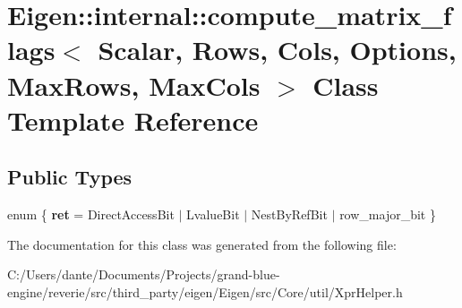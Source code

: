 \hypertarget{class_eigen_1_1internal_1_1compute__matrix__flags}{}\section{Eigen\+::internal\+::compute\+\_\+matrix\+\_\+flags$<$ Scalar, Rows, Cols, Options, Max\+Rows, Max\+Cols $>$ Class Template Reference}
\label{class_eigen_1_1internal_1_1compute__matrix__flags}
\subsection*{Public Types}
\begin{DoxyCompactItemize}
\item 
\mbox{\label{class_eigen_1_1internal_1_1compute__matrix__flags_aa499f28003d84edb537e3632a9256bbe}} 
enum \{ {\bfseries ret} = Direct\+Access\+Bit $\vert$ Lvalue\+Bit $\vert$ Nest\+By\+Ref\+Bit $\vert$ row\+\_\+major\+\_\+bit
 \}
\end{DoxyCompactItemize}


The documentation for this class was generated from the following file\+:\begin{DoxyCompactItemize}
\item 
C\+:/\+Users/dante/\+Documents/\+Projects/grand-\/blue-\/engine/reverie/src/third\+\_\+party/eigen/\+Eigen/src/\+Core/util/Xpr\+Helper.\+h\end{DoxyCompactItemize}
